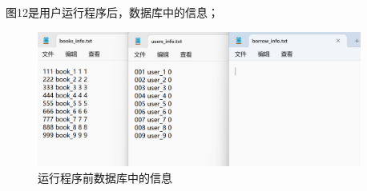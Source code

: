 \documentclass{ctexart}
\begin{document}
    图12是用户运行程序后，数据库中的信息；
    
    \vspace{2em}
        
    \begin{figure}[!htbp] %
        \centering
        \includegraphics[width=0.95\textwidth]{src/before.png}
        \caption{运行程序前数据库中的信息}    
    \end{figure}
    
\end{document}
